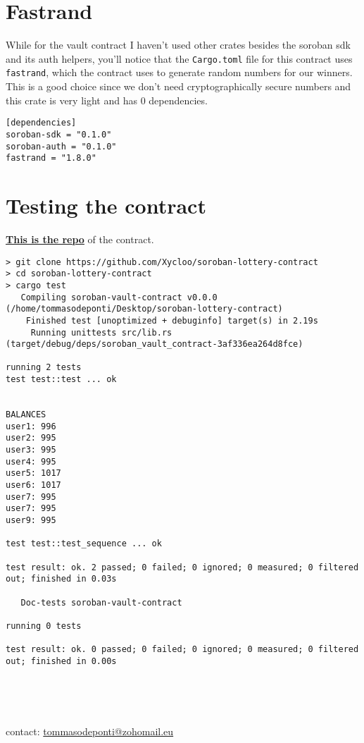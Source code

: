\documentclass{article}
\newcommand{\inl}[1]{\lstinline{#1}}
\begin{document}
\section{Fastrand}

While for the vault contract I haven't used other crates besides the soroban sdk and its auth helpers, you'll notice that the \inl{Cargo.toml} file for this contract uses \inl{fastrand}, which the contract uses to generate random numbers for our winners. This is a good choice since we don't need cryptographically secure numbers and this crate is very light and has 0 dependencies.

\begin{lstlisting}
[dependencies]
soroban-sdk = "0.1.0"
soroban-auth = "0.1.0"
fastrand = "1.8.0"
\end{lstlisting}

\section{Testing the contract}
\textbf{\href{https://github.com/Xycloo/soroban-lottery-contract}{This is the repo}} of the contract.

\begin{lstlisting}
> git clone https://github.com/Xycloo/soroban-lottery-contract
> cd soroban-lottery-contract
> cargo test
   Compiling soroban-vault-contract v0.0.0 (/home/tommasodeponti/Desktop/soroban-lottery-contract)
    Finished test [unoptimized + debuginfo] target(s) in 2.19s
     Running unittests src/lib.rs (target/debug/deps/soroban_vault_contract-3af336ea264d8fce)

running 2 tests
test test::test ... ok


BALANCES
user1: 996
user2: 995
user3: 995 
user4: 995 
user5: 1017
user6: 1017 
user7: 995
user7: 995
user9: 995

test test::test_sequence ... ok

test result: ok. 2 passed; 0 failed; 0 ignored; 0 measured; 0 filtered out; finished in 0.03s

   Doc-tests soroban-vault-contract

running 0 tests

test result: ok. 0 passed; 0 failed; 0 ignored; 0 measured; 0 filtered out; finished in 0.00s

\end{lstlisting}

\

\

contact: \href{mailto:tommasodeponti@zohomail.eu}{tommasodeponti@zohomail.eu}
\end{document}
